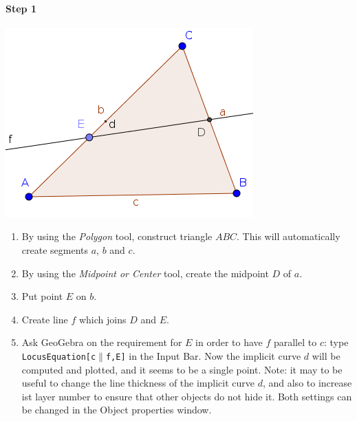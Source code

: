 \documentclass{article}
\begin{document}
\paragraph{Step 1}
\begin{center}
\includegraphics[scale=0.5]{classroom1}
\end{center}
\begin{enumerate}
    \item By using the \textit{Polygon} tool, construct triangle $ABC$. This will automatically create segments $a$, $b$ and $c$.
    \item By using the \textit{Midpoint or Center} tool, create the midpoint $D$ of $a$.
    \item Put point $E$ on $b$.
    \item Create line $f$ which joins $D$ and $E$.
    \item Ask GeoGebra on the requirement for $E$ in order to have $f$ parallel to $c$: type \texttt{LocusEquation[c$\parallel$f,E]} in the Input Bar. Now the implicit curve $d$ will be computed and plotted, and it seems to be a single point. Note: it may to be useful to change the line thickness of the implicit curve $d$, and also to increase ist layer number to ensure that other objects do not hide it. Both settings can be changed in the Object properties window.
\end{enumerate}
\end{document}
